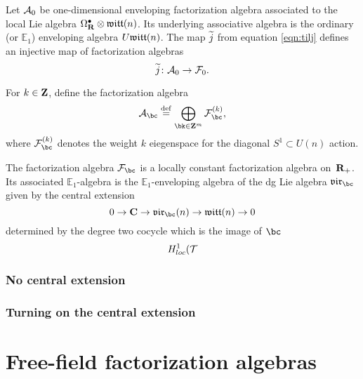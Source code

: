 \documentclass[11pt]{amsart}
\newcommand{\vir}{\lie{vir}}
\begin{document}
Let $\mathcal A_{0}$ be one-dimensional enveloping factorization algebra associated to the local Lie algebra $\Omega^{\bullet}_{\mathbf{R}} \otimes \mathfrak{witt}(n)$.
Its underlying associative algebra is the ordinary (or $\mathbb{E}_1$) enveloping algebra $U \mathfrak{witt}(n)$.
The map $\widetilde j$ from equation \eqref{eqn:tilj} defines an injective map of factorization algebras
\begin{equation}\label{eqn:injective}
\widetilde j \colon \mathcal A_{0} \to \mathcal F_{0} .
\end{equation}


For $k \in \mathbf{Z}$, define the factorization algebra
\begin{equation}
\cA_{\bc} \define \bigoplus_{\bk \in \Z^m} \cF_{\bc}^{(k)} ,
\end{equation}
where $\cF_{\bc}^{(k)}$ denotes the weight $k$ eiegenspace for the diagonal $S^{1} \subset U(n)$ action.

\begin{prop}
The factorization algebra $\cF_{\bc}$ is a locally constant factorization algebra on~$\mathbf{R}_+$. 
Its associated $\mathbb{E}_1$-algebra is the $\mathbb{E}_1$-enveloping algebra of the dg Lie algebra $\vir_{\bc}$ given by the central extension
\begin{equation}
0 \to \C \to \lie{vir}_{\bc} (n) \to \lie{witt}(n) \to 0
\end{equation}
determined by the degree two cocycle which is the image of $\bc$ 
\begin{equation}
H^1_{loc}(\mathcal T
\end{equation}
\end{prop}

\subsubsection{No central extension}

\subsubsection{Turning on the central extension}



\section{Free-field factorization algebras}
\label{s:free}
\end{document}
